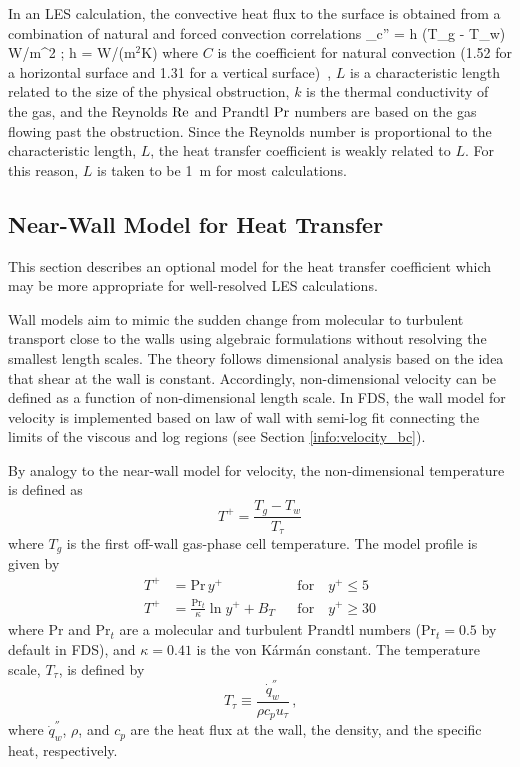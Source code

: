 In an LES calculation, the convective heat flux to the surface is
obtained from a combination of natural and forced
convection correlations
\be \dq_c'' = h (T_g - T_w)
    \quad \hbox{W/m}^2 \quad ; \quad h =
    \max \;   \quad
    \hbox{W/(m$^2$\rmcdot K)} \ee
where $C$ is the coefficient for natural convection (1.52 for a horizontal surface
and 1.31 for a vertical surface)~\cite{Holman:1},
$L$ is a characteristic length related to the size of the physical
obstruction, $k$ is the thermal conductivity of the
gas, and the Reynolds $\hbox{Re}$ and Prandtl $\hbox{Pr}$ numbers are based on the
gas flowing
past the obstruction. Since the Reynolds number is proportional to the
characteristic length, $L$, the heat transfer coefficient is weakly
related to $L$. For this reason, $L$ is taken to be 1~m for most
calculations.


\subsection{Near-Wall Model for Heat Transfer}
\label{conflux_wall_model}

This section describes an optional model for the heat transfer coefficient which may be more appropriate for well-resolved LES calculations.

Wall models aim to mimic the sudden change from molecular to turbulent transport close to the walls using algebraic formulations without resolving the smallest length scales. The theory follows dimensional analysis based on the idea that shear at the wall is constant. Accordingly, non-dimensional velocity can be defined as a function of non-dimensional length scale. In FDS, the wall model for velocity is implemented based on law of wall with semi-log fit connecting the limits of the viscous and log regions (see Section \ref{info:velocity_bc}).

By analogy to the near-wall model for velocity, the non-dimensional temperature is defined as
\begin{equation}
T^+ = \frac{T_g - T_w}{T_\tau}
\end{equation}
where $T_g$ is the first off-wall gas-phase cell temperature.  The model profile is given by
\begin{align}
\label{eqn_t_visclayer} T^+ &= \mbox{Pr}\,y^+                            && \mbox{for} \quad y^+ \le 5 \\
\label{eqn_t_loglaw}    T^+ &= \frac{\mbox{Pr}_t}{\kappa} \ln y^+ + B_T  && \mbox{for} \quad y^+ \ge 30
\end{align}
where Pr and Pr$_t$ are a molecular and turbulent Prandtl numbers  (Pr$_t=0.5$ by default in FDS), and $\kappa = 0.41$ is the von K\'arm\'an constant.  The temperature scale, $T_{\tau}$, is defined by
\begin{equation}
\label{eqn_friction_temperature}
T_{\tau} \equiv \frac{\dot{q}_w^{''}}{{\rho}{c_p}{u_{\tau}}} \,\mbox{,}
\end{equation}
where $\dot{q}_w^{''}$, $\rho$, and $c_p$ are the heat flux at the wall, the density, and the specific heat, respectively.

